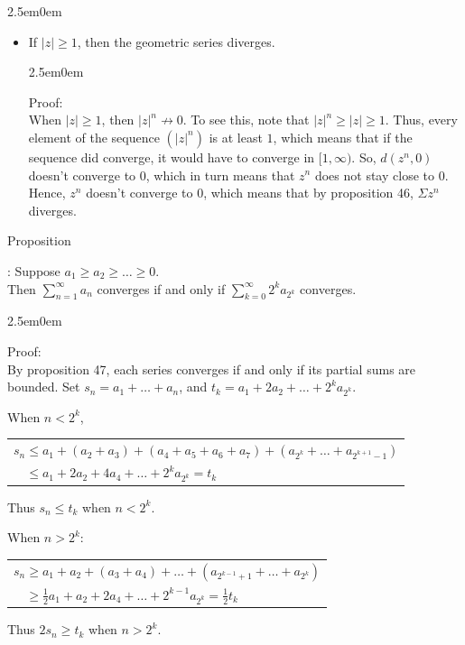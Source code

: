 \documentclass{book}
\newcommand{\hThree}{%
   \color{PineGreen}
   \fontsize{13}{15}\selectfont%
}
\newenvironment{myIndent}{%
   \begin{adjustwidth}{2.5em}{0em}%
}{%
   \end{adjustwidth}%
}
\newcommand{\retTwo}{\hfill\bigbreak}
\newcounter{PropNumber}
\newcommand{\propCount}[1][1]{%
   \addtocounter{PropNumber}{#1}%
   \thePropNumber%
}
\begin{document}
{\begin{myIndent}
\begin{itemize}
            \newpage

            \item If $|z| \geq 1$, then the geometric series diverges.
            
            {\begin{myIndent} \hThree
               Proof:\\
               When $|z| \geq 1$, then $|z|^n \not\rightarrow 0$. To see this, note that $|z|^n \geq |z| \geq 1$. Thus, every element of the sequence $(|z|^n)$ is at least $1$, which means that if the sequence did converge, it would have to converge in $[1, \infty)$. So, $d(z^n, 0)$ doesn't converge to $0$, which in turn means that $z^n$ does not stay close to $0$. Hence, $z^n$ doesn't converge to $0$, which means that by proposition 46, $\Sigma z^n$ diverges. \retTwo
            \end{myIndent}}
         \end{itemize}

         Proposition \propCount: Suppose $a_1 \geq a_2 \geq \ldots \geq 0$.\\ Then $\sum\limits_{n=1}^\infty{a_n}$ converges if and only if $\sum\limits_{k=0}^\infty{2^ka_{2^k}}$ converges.
         {\begin{myIndent} \hThree
            Proof:\\
            By proposition 47, each series converges if and only if its partial sums are bounded. Set $s_n = a_1 + \ldots + a_n$, and $t_k = a_1 + 2a_2 + \ldots + 2^ka_{2^k}$. \retTwo

            When $n < 2^k$,\\
            \begin{tabular}{l}
              $s_n \leq a_1 + (a_2 + a_3) + (a_4 + a_5 + a_6 + a_7) + (a_{2^k}+\ldots+a_{2^{k+1}-1})$\\
              $\phantom{s_n} \leq a_1 + 2a_2 + 4a_4 + \ldots + 2^ka_{2^k} = t_k$
            \end{tabular}\retTwo
            Thus $s_n \leq t_k$ when $n < 2^k$. \retTwo

            When $n > 2^k$:\\
            \begin{tabular}{l}
               $s_n \geq a_1 + a_2 + (a_3 + a_4) + \ldots + (a_{2^{k-1} + 1}+\ldots+a_{2^{k}})$\\
               $\phantom{s_n} \geq \frac{1}{2}a_1 + a_2 + 2a_4 + \ldots + 2^{k-1}a_{2^k} = \frac{1}{2}t_k$
            \end{tabular}\retTwo
            Thus $2s_n \geq t_k$ when $n > 2^k$. \retTwo
            

\end{myIndent}}
\end{myIndent}}
\end{document}
